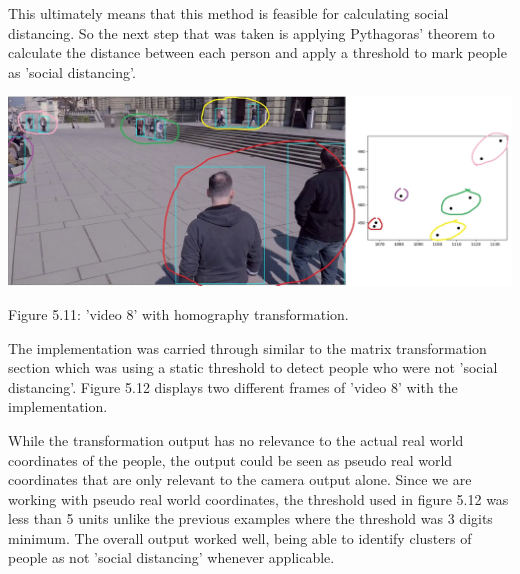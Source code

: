 \documentclass[12pt]{report}
\begin{document}
\vspace{2mm}

This ultimately means that this method is feasible for calculating social distancing. So the next step that was taken is applying Pythagoras' theorem to calculate the distance between each person and apply a threshold to mark people as 'social distancing'.



\begin{center}
	\includegraphics[width=150mm]{./images/appendix/HomographyMapping.JPG}
	
	
	{\footnotesize Figure 5.11: 'video 8' with homography transformation.}
\end{center}

The implementation was carried through similar to the matrix transformation section which was using a static threshold to detect people who were not 'social distancing'. Figure 5.12 displays two different frames of 'video 8' with the implementation.

\vspace{2mm}

While the transformation output has no relevance to the actual real world coordinates of the people, the output could be seen as pseudo real world coordinates that are only relevant to the camera output alone. Since we are working with pseudo real world coordinates, the threshold used in figure 5.12 was less than 5 units unlike the previous examples where the threshold was 3 digits minimum. The overall output worked well, being able to identify clusters of people as not 'social distancing' whenever applicable.
\end{document}
